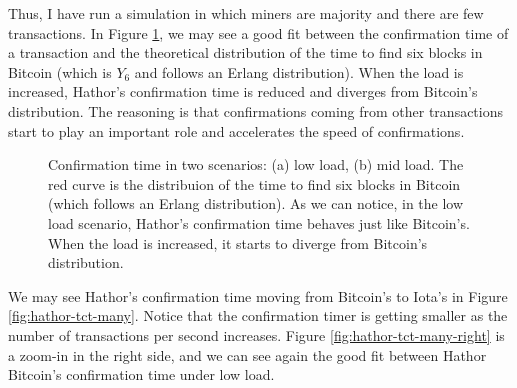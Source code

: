 Thus, I have run a simulation in which miners are majority and there are few transactions. In Figure \ref{fig:hathor-tct-low-mid}, we may see a good fit between the confirmation time of a transaction and the theoretical distribution of the time to find six blocks in Bitcoin (which is $Y_6$ and follows an Erlang distribution). When the load is increased, Hathor's confirmation time is reduced and diverges from Bitcoin's distribution. The reasoning is that confirmations coming from other transactions start to play an important role and accelerates the speed of confirmations.

\begin{figure}[!htb]
\centering
{}

\caption{Confirmation time in two scenarios: (a) low load, (b) mid load. The red curve is the distribuion of the time to find six blocks in Bitcoin (which follows an Erlang distribution). As we can notice, in the low load scenario, Hathor's confirmation time behaves just like Bitcoin's. When the load is increased, it starts to diverge from Bitcoin's distribution. \label{fig:hathor-tct-low-mid}}
\end{figure}

We may see Hathor's confirmation time moving from Bitcoin's to Iota's in Figure \ref{fig:hathor-tct-many}. Notice that the confirmation timer is getting smaller as the number of transactions per second increases. Figure \ref{fig:hathor-tct-many-right} is a zoom-in in the right side, and we can see again the good fit between Hathor Bitcoin's confirmation time under low load.

